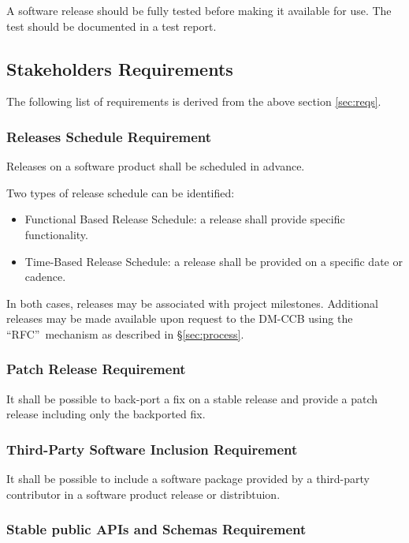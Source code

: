 A software release should be fully tested before making it available for use.
The test should be documented in a test report.


\subsection{Stakeholders Requirements} \label{sec:stakeholdersreqs}

The following list of requirements is derived from the above section \ref{sec:reqs}.


\subsubsection{Releases Schedule Requirement} \label{sec:milestone}

Releases on a software product shall be scheduled in advance.

Two types of release schedule can be identified:

\begin{itemize}
\item Functional Based Release Schedule: a release shall provide specific functionality.
\item Time-Based Release Schedule: a release shall be provided on a specific date or cadence.
\end{itemize}

In both cases, releases may be associated with project milestones.
Additional releases may be made available upon request to the DM-CCB using the “RFC” mechanism as described in \S\ref{sec:process}.


\subsubsection{Patch Release Requirement} \label{sec:backport}

It shall be possible to back-port a fix on a stable release and provide a patch release including only the backported fix.


\subsubsection{Third-Party Software Inclusion Requirement} \label{sec:thirdsw}

It shall be possible to include a software package provided by a third-party contributor in a software product release or distribtuion.


\subsubsection{Stable public APIs and Schemas Requirement} \label{sec:stable}

